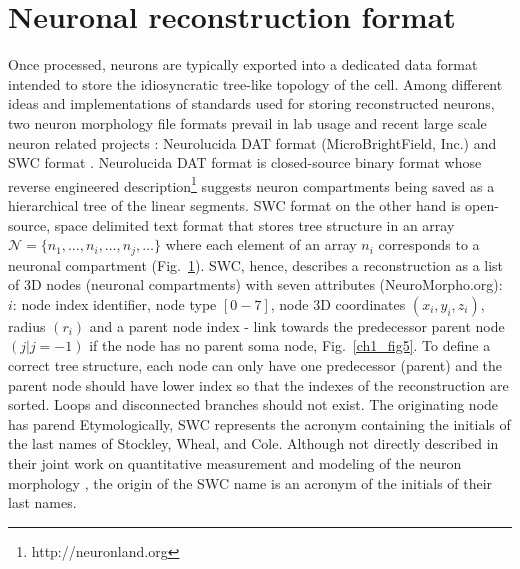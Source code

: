 \section{Neuronal reconstruction format}
Once processed, neurons are typically exported into a dedicated data format intended to store the idiosyncratic tree-like topology of the cell. Among different ideas and implementations of standards used for storing reconstructed neurons, two neuron morphology file formats prevail in lab usage and recent large scale neuron related projects \cite{bakker2016web}: Neurolucida DAT format (MicroBrightField, Inc.) and SWC format \cite{cannon1998line}. Neurolucida DAT format is closed-source binary format whose reverse engineered description\footnote{http://neuronland.org} suggests neuron compartments being saved as a hierarchical tree of the linear segments. SWC format on the other hand is open-source, space delimited text format that stores tree structure in an array $\mathcal{N} = \{ n_1, \dots , n_i, \dots , n_j, \dots  \}$ where each element of an array $n_i$ corresponds to a neuronal compartment (Fig.~\ref{}). SWC, hence, describes a reconstruction as a list of 3D nodes (neuronal compartments) with seven attributes (NeuroMorpho.org):  $i$: node index identifier, node type $[0-7]$, node 3D coordinates $(x_i,y_i,z_i)$, radius $(r_i)$ and a parent node index - link towards the predecessor parent node $(j | j=-1)$ if the node has no parent soma node, Fig.~\ref{ch1_fig5}. To define a correct tree structure, each node can only have one predecessor (parent) and the parent node should have lower index so that the indexes of the reconstruction are sorted. Loops and disconnected branches should not exist. The originating node has parend  Etymologically, SWC represents the acronym containing the initials of the last names of Stockley, Wheal, and Cole. Although not directly described in their joint work on quantitative measurement and modeling of the neuron morphology \cite{stockley1993system}, the origin of the SWC name is an acronym of the initials of their last names. 

